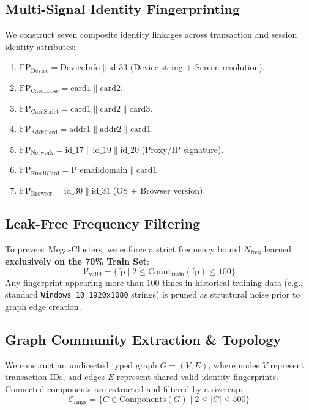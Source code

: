 \documentclass[conference]{IEEEtran}
\begin{document}
\subsection{Multi-Signal Identity Fingerprinting}
We construct seven composite identity linkages across transaction and session identity attributes:
\begin{enumerate}
    \item $\text{FP}_{\text{Device}} = \text{DeviceInfo} \parallel \text{id\_33}$ (Device string + Screen resolution).
    \item $\text{FP}_{\text{CardLoose}} = \text{card1} \parallel \text{card2}$.
    \item $\text{FP}_{\text{CardStrict}} = \text{card1} \parallel \text{card2} \parallel \text{card3}$.
    \item $\text{FP}_{\text{AddrCard}} = \text{addr1} \parallel \text{addr2} \parallel \text{card1}$.
    \item $\text{FP}_{\text{Network}} = \text{id\_17} \parallel \text{id\_19} \parallel \text{id\_20}$ (Proxy/IP signature).
    \item $\text{FP}_{\text{EmailCard}} = \text{P\_emaildomain} \parallel \text{card1}$.
    \item $\text{FP}_{\text{Browser}} = \text{id\_30} \parallel \text{id\_31}$ (OS + Browser version).
\end{enumerate}

\subsection{Leak-Free Frequency Filtering}
To prevent Mega-Clusters, we enforce a strict frequency bound $N_{\text{freq}}$ learned \textbf{exclusively on the 70\% Train Set}:
\begin{equation}
\mathcal{V}_{\text{valid}} = \{ \text{fp} \mid 2 \le \text{Count}_{\text{train}}(\text{fp}) \le 100 \}
\end{equation}
Any fingerprint appearing more than 100 times in historical training data (e.g., standard \texttt{Windows 10\_1920x1080} strings) is pruned as structural noise prior to graph edge creation.

\subsection{Graph Community Extraction \& Topology}
We construct an undirected typed graph $G = (V, E)$, where nodes $V$ represent transaction IDs, and edges $E$ represent shared valid identity fingerprints. Connected components are extracted and filtered by a size cap:
\begin{equation}
\mathcal{C}_{\text{rings}} = \{ C \in \text{Components}(G) \mid 2 \le |C| \le 500 \}
\end{equation}
\end{document}

